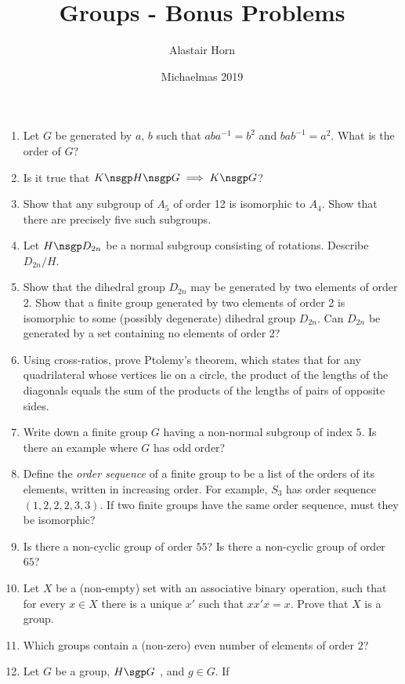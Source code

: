 \documentclass[a4paper,12pt]{article}
\author{Alastair Horn}
\date{Michaelmas 2019}
\title{Groups - Bonus Problems}
\begin{document}
\maketitle

\begin{enumerate}
 \item Let \(G\) be generated by \(a\), \(b\) such that \(aba^{-1} = b^2\) and
       \(bab^{-1} = a^2\). What is the order of \(G\)?
 \item Is it true that \(K \nsgp H \nsgp G \implies K \nsgp G\)?
 \item Show that any subgroup of \(A_5\) of order 12 is isomorphic to \(A_4\).
       Show that there are precisely five such subgroups.
 \item Let \(H \nsgp D_{2n}\) be a normal subgroup consisting of rotations.
       Describe \(D_{2n} / H\).
 \item Show that the dihedral group \(D_{2n}\) may be generated by two elements
       of order 2. Show that a finite group generated by two elements of order
       2 is isomorphic to some (possibly degenerate) dihedral group \(D_{2n}\).
       Can \(D_{2n}\) be generated by a set containing no elements of order 2?
 \item Using cross-ratios, prove Ptolemy’s theorem, which states that for any
       quadrilateral whose vertices lie on a circle, the product of the lengths
       of the diagonals equals the sum of the products of the lengths of pairs
       of opposite sides.
 \item Write down a finite group \(G\) having a non-normal subgroup of index
       \(5\). Is there an example where \(G\) has odd order?
 \item Define the \emph{order sequence} of a finite group to be a list of the
       orders of its elements, written in increasing order. For example, \(S_3\)
       has order sequence \((1, 2, 2, 2, 3, 3)\). If two finite groups have the
       same order sequence, must they be isomorphic?
 \item Is there a non-cyclic group of order \(55\)? Is there a non-cyclic group
       of order \(65\)?
 \item Let \(X\) be a (non-empty) set with an associative binary operation, such
       that for every \(x \in X\) there is a unique \(x'\) such that
       \(xx'x = x\). Prove that \(X\) is a group.
 \item Which groups contain a (non-zero) even number of elements of order \(2\)?
 \item Let \(G\) be a group, \(H \sgp G\) , and \(g \in G\). If

\end{enumerate}
\end{document}

